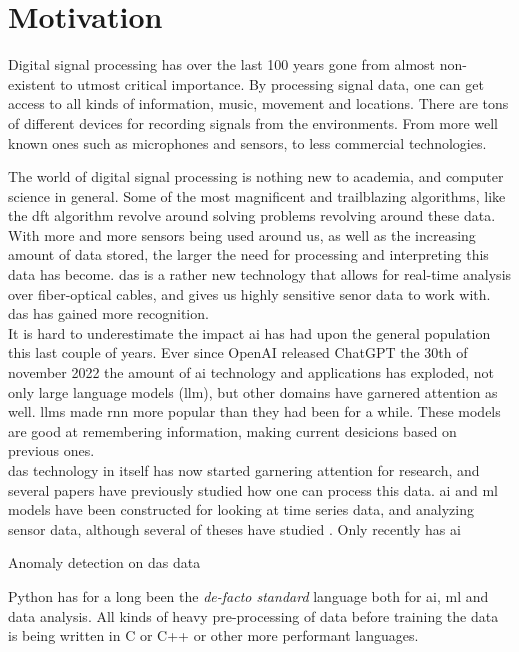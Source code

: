 \section{Motivation}

Digital signal processing has over the last 100 years gone from almost non-existent to utmost critical importance. By processing signal data, one can get access to all kinds of information, music, movement and locations. There are tons of different devices for recording signals from the environments. From more well known ones such as microphones and sensors, to less commercial technologies.

The world of digital signal processing is nothing new to academia, and computer science in general. Some of the most magnificent and trailblazing algorithms, like the \acrfull{dft} algorithm revolve around solving problems revolving around these data. With more and more sensors being used around us, as well as the increasing amount of data stored, the larger the need for processing and interpreting this data has become. 
\acrfull{das} is a rather new technology that allows for real-time analysis over fiber-optical cables, and gives us highly sensitive senor data to work with. \acrshort{das} has gained more recognition. \\

It is hard to underestimate the impact \acrshort{ai} has had upon the general population this last couple of years. Ever since OpenAI released ChatGPT the 30th of november 2022 \cite{chatgpt} the amount of \acrshort{ai} technology and applications has exploded, not only large language models (\acrshort{llm}), but other domains have garnered attention as well. \acrshort{llm}s made \acrfull{rnn} more popular than they had been for a while. These models are good at remembering information, making current desicions based on previous ones. \\ 

\acrshort{das} technology in itself has now started garnering attention for research, and several papers have previously studied  how one can process this data. \acrshort{ai} and \acrshort{ml} models have been constructed for looking at time series data, and analyzing sensor data, although several of theses have studied .  Only recently has \acrshort{ai}

Anomaly detection on \acrshort{das} data


Python has for a long been the \textit{de-facto standard} language both for \acrshort{ai}, \acrshort{ml} and data analysis. All kinds of heavy pre-processing of data before training the data is being written in C or C++ or other more performant languages.    




